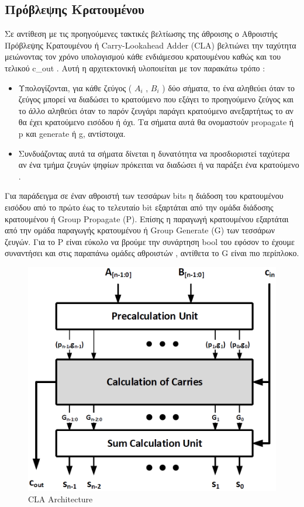 \subsection{Πρόβλεψης Κρατουμένου}
Σε αντίθεση με τις προηγούμενες τακτικές βελτίωσης της άθροισης ο Αθροιστής Πρόβλεψης Κρατουμένου ή Carry-Lookahead Adder (CLA) βελτιώνει την ταχύτητα μειώνοντας τον χρόνο υπολογισμού κάθε ενδιάμεσου κρατουμένου καθώς και του τελικού c\_out .
Αυτή η αρχιτεκτονική υλοποιείται με τον παρακάτω τρόπο :
\begin{itemize}
    \item Υπολογίζονται, για κάθε ζεύγος ( $A_i$ , $B_i$ ) δύο σήματα, το ένα αληθεύει 
    όταν το ζεύγος μπορεί να διαδώσει το κρατούμενο που εξάγει το προηγούμενο ζεύγος 
    και το άλλο αληθεύει όταν το παρόν ζευγάρι παράγει κρατούμενο ανεξαρτήτως το 
    αν θα έχει κρατούμενο εισόδου ή όχι. Τα σήματα αυτά θα ονομαστούν propagate ή p
    και generate ή g, αντίστοιχα. 
    \item Συνδυάζοντας αυτά τα σήματα δίνεται η δυνατότητα να προσδιοριστεί ταχύτερα αν ένα τμήμα ζευγών ψηφίων πρόκειται να διαδώσει ή να παράξει ένα κρατούμενο .
\end{itemize}


Για παράδειγμα σε έναν αθροιστή των τεσσάρων bits η διάδοση του κρατουμένου εισόδου από το πρώτο έως το τελευταίο bit εξαρτάται από την ομάδα διάδοσης κρατουμένου ή Group Propagate (P). Επίσης η παραγωγή κρατουμένου εξαρτάται από την ομάδα παραγωγής κρατουμένου ή Group Generate (G) των τεσσάρων ζευγών. Για το P είναι εύκολο να βρούμε την συνάρτηση bool του εφόσον το έχουμε συναντήσει και στις παραπάνω ομάδες αθροιστών , αντίθετα το G είναι πιο περίπλοκο. 

\begin{figure}[H]
\centering
\includegraphics[width=\textwidth]{Pictures/CLA_Architecture.png}
\caption{CLA Architecture}
\label{cla_architecture}
\end{figure}
